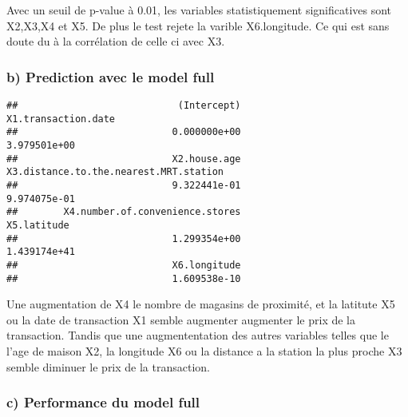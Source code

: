 \documentclass[
]{article}
\newenvironment{Shaded}{\begin{snugshade}}{\end{snugshade}}
\newcommand{\CommentTok}[1]{\textcolor[rgb]{0.56,0.35,0.01}{\textit{#1}}}
\newcommand{\DataTypeTok}[1]{\textcolor[rgb]{0.13,0.29,0.53}{#1}}
\newcommand{\KeywordTok}[1]{\textcolor[rgb]{0.13,0.29,0.53}{\textbf{#1}}}
\newcommand{\NormalTok}[1]{#1}
\newcommand{\OperatorTok}[1]{\textcolor[rgb]{0.81,0.36,0.00}{\textbf{#1}}}
\newcommand{\StringTok}[1]{\textcolor[rgb]{0.31,0.60,0.02}{#1}}
\begin{document}
Avec un seuil de p-value à 0.01, les variables statistiquement
significatives sont X2,X3,X4 et X5. De plus le test rejete la varible
X6.longitude. Ce qui est sans doute du à la corrélation de celle ci avec
X3.

\hypertarget{b-prediction-avec-le-model-full}{%
\subsubsection{b) Prediction avec le model
full}\label{b-prediction-avec-le-model-full}}

\begin{Shaded}
\end{Shaded}

\begin{verbatim}
##                            (Intercept)                    X1.transaction.date 
##                           0.000000e+00                           3.979501e+00 
##                           X2.house.age X3.distance.to.the.nearest.MRT.station 
##                           9.322441e-01                           9.974075e-01 
##        X4.number.of.convenience.stores                            X5.latitude 
##                           1.299354e+00                           1.439174e+41 
##                           X6.longitude 
##                           1.609538e-10
\end{verbatim}

Une augmentation de X4 le nombre de magasins de proximité, et la
latitute X5 ou la date de transaction X1 semble augmenter augmenter le
prix de la transaction. Tandis que une augmententation des autres
variables telles que le l'age de maison X2, la longitude X6 ou la
distance a la station la plus proche X3 semble diminuer le prix de la
transaction.

\hypertarget{c-performance-du-model-full}{%
\subsubsection{c) Performance du model
full}\label{c-performance-du-model-full}}
\end{document}

